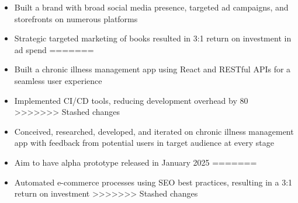 \par\smallskip
\begin{minipage}{13.75cm}
  \begin{minipage}{6.5cm}
    \begin{itemize}
<<<<<<< Updated upstream
      \item Built a brand with broad social media presence, targeted
            ad campaigns, and storefronts on numerous platforms
      \item Strategic targeted marketing of books resulted in 3:1
            return on investment in ad spend
=======
      \item Built a chronic illness management app using React and RESTful APIs for a seamless user experience
      \item Implemented CI/CD tools, reducing development overhead by 80%
>>>>>>> Stashed changes
    \end{itemize}
  \end{minipage}
  \hfill
  \begin{minipage}{6.5cm}
    \begin{itemize}
<<<<<<< Updated upstream
      \item Conceived, researched, developed, and iterated on
            chronic illness management app with feedback from
            potential users in target audience at every stage
      \item Aim to have alpha prototype released in January 2025
=======
      \item Automated e-commerce processes using SEO best practices, resulting in a 3:1 return on investment
>>>>>>> Stashed changes
    \end{itemize}
  \end{minipage}
\end{minipage}
\par\smallskip
\divider

